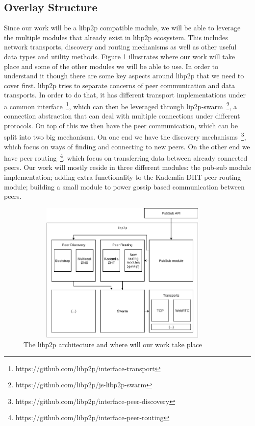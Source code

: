 \subsection{Overlay Structure}\label{overlay-structure-solution}

Since our work will be a libp2p compatible module, we will be able to
leverage the multiple modules that already exist in libp2p ecosystem.
This includes network transports, discovery and routing mechanisms as
well as other useful data types and utility methods. Figure \ref{fig:libp2p-stack}
illustrates where our work will take place and
some of the other modules we will be able to use. In order to understand
it though there are some key aspects around libp2p that we need to cover
first. libp2p tries to separate concerns of peer communication and data
transports. In order to do that, it has different transport implementations
under a common interface~\footnote{https://github.com/libp2p/interface-transport},
which can then be leveraged through lip2p-swarm~\footnote{https://github.com/libp2p/js-libp2p-swarm},
a connection abstraction that can deal with multiple
connections under different protocols. On top of this we then have the
peer communication, which can be split into two big mechanisms. On one
end we have the discovery mechanisms~\footnote{https://github.com/libp2p/interface-peer-discovery},
which focus on ways of finding and connecting to new peers.
On the other end we have peer routing~\footnote{https://github.com/libp2p/interface-peer-routing},
which focus on transferring data between already connected
peers. Our work will mostly reside in three different modules: the
pub-sub module implementation; adding extra functionality to the
Kademlia DHT peer routing module; building a small module to power
gossip based communication between peers.

\begin{figure}[hb!]
  \centering
  \includegraphics[max height=7cm,max width=0.95\textwidth]{img/libp2p-stack.png}
  \caption{The libp2p architecture and where will our work take place}
  \label{fig:libp2p-stack}
\end{figure}

